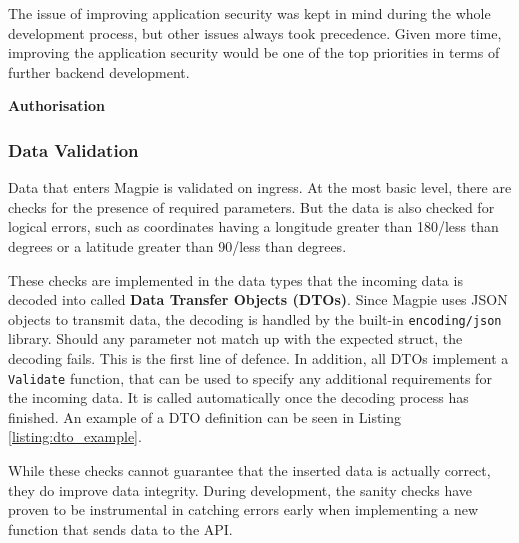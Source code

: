 The issue of improving application security was kept in mind during the whole
development process, but other issues always took precedence. Given more time,
improving the application security would be one of the top priorities in terms
of further backend development.

\label{route_authorisation}\textbf{Authorisation}


\subsubsection{Data Validation}
Data that enters Magpie is validated on ingress. At the most basic level, there
are checks for the presence of required parameters. But the data is also checked
for logical errors, such as coordinates having a longitude greater than 180/less
than  degrees or a latitude greater than 90/less than  degrees.

These checks are implemented in the data types that the incoming data is decoded
into called \textbf{Data Transfer Objects (DTOs)}. Since Magpie uses JSON
objects to transmit data, the decoding is handled by the built-in
\texttt{encoding/json} library. Should any parameter not match up with the
expected struct, the decoding fails. This is the first line of defence. In
addition, all DTOs implement a \texttt{Validate} function, that can be used to
specify any additional requirements for the incoming data. It is called
automatically once the decoding process has finished. An example of a DTO
definition can be seen in Listing \ref{listing:dto_example}.

While these checks cannot guarantee that the inserted data is actually correct,
they do improve data integrity. During development, the sanity checks have
proven to be instrumental in catching errors early when implementing a new
function that sends data to the API.

